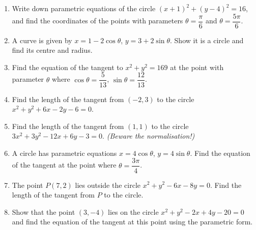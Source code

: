 \documentclass[11pt]{article}
\begin{document}
\begin{exercice}[Consolidation]
\begin{enumerate}
\item Write down parametric equations of the circle $(x+1)^2 + (y-4)^2 = 16$, and find the coordinates of the points with parameters $\theta = \dfrac{\pi}{6}$ and $\theta = \dfrac{5\pi}{6}$.
\item A curve is given by $x = 1 - 2\cos\theta$, $y = 3 + 2\sin\theta$. Show it is a circle and find its centre and radius.
\item Find the equation of the tangent to $x^2 + y^2 = 169$ at the point with parameter $\theta$ where $\cos\theta = \dfrac{5}{13}$, $\sin\theta = \dfrac{12}{13}$.
\item Find the length of the tangent from $(-2, 3)$ to the circle $x^2 + y^2 + 6x - 2y - 6 = 0$.
\item Find the length of the tangent from $(1, 1)$ to the circle $3x^2 + 3y^2 - 12x + 6y - 3 = 0$. \emph{(Beware the normalisation!)}
\item A circle has parametric equations $x = 4\cos\theta$, $y = 4\sin\theta$. Find the equation of the tangent at the point where $\theta = \dfrac{3\pi}{4}$.
\item The point $P(7, 2)$ lies outside the circle $x^2 + y^2 - 6x - 8y = 0$. Find the length of the tangent from $P$ to the circle.
\item Show that the point $(3, -4)$ lies on the circle $x^2 + y^2 - 2x + 4y - 20 = 0$ and find the equation of the tangent at this point using the parametric form.
\end{enumerate}
\end{exercice}
\end{document}
